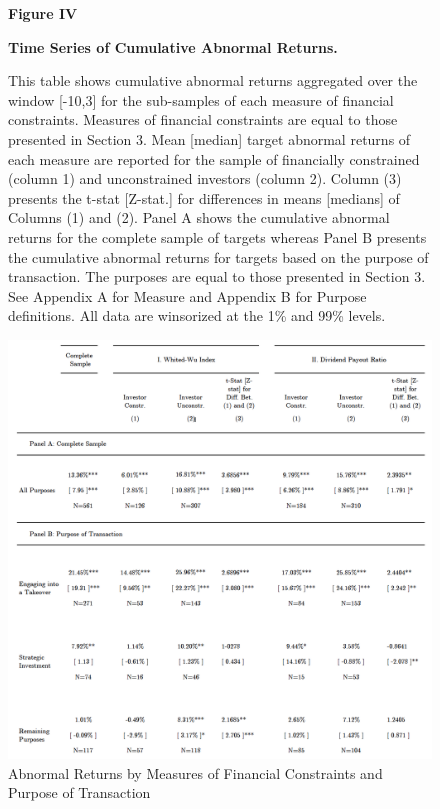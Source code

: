 \documentclass[12pt]{article}
\begin{document}
%
\begin{figure}[!htbp]
	\centering
	\captionsetup{textformat=empty,labelformat=blank}
	\caption{Abnormal Returns by Measures of Financial Constraints and Purpose of Transaction}
	\textbf{Figure IV}\par\medskip
	\large\textbf{Time Series of Cumulative Abnormal Returns.}\par\medskip
	\justifying
	\footnotesize\noindent{}This table shows cumulative abnormal returns aggregated over the window [-10,3] for the sub-samples of each measure of financial constraints. Measures of financial constraints are equal to those presented in Section 3. Mean [median] target abnormal returns of each measure are reported for the sample of financially constrained (column 1) and unconstrained investors (column 2). Column (3) presents the t-stat [Z-stat.] for differences in means [medians] of Columns (1) and (2). Panel A shows the cumulative abnormal returns for the complete sample of targets whereas Panel B presents the cumulative abnormal returns for targets based on the purpose of transaction. The purposes are equal to those presented in Section 3. See Appendix A for Measure and Appendix B for Purpose definitions. All data are winsorized at the 1\% and 99\% levels.\par\medskip
	\centering													
	\begin{adjustbox}{width=\textwidth}
		\includegraphics{Measures1}
	\end{adjustbox}\par\medskip
\end{figure}
\end{document}
